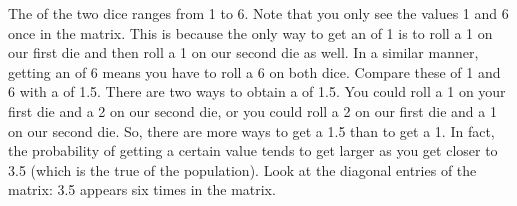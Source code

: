 
The  of the two dice ranges from 1 to 6. Note that you only see the values 1 and 6 once in the matrix. This is because the only way to get an  of 1 is to roll a 1 on our first die and then roll a 1 on our second die as well. In a similar manner, getting an  of 6 means you have to roll a 6 on both dice. Compare these  of 1 and 6 with a  of 1.5. There are two ways to obtain a  of 1.5. You could roll a 1 on your first die and a 2 on our second die, or you could roll a 2 on our first die and a 1 on our second die. So, there are more ways to get a 1.5 than to get a 1. In fact, the probability of getting a certain value tends to get larger as you get closer to 3.5 (which is the true  of the population). Look at the diagonal entries of the matrix: 3.5 appears six times in the matrix. \\

